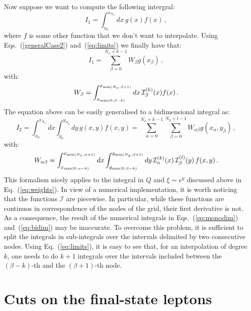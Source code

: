 \documentclass[10pt,a4paper]{article}
\begin{document}
Now suppose we want to compute the following intergral:
\begin{equation}
I_1 = \int_{x_0}^{x_{N_x}}dx\,g(x)f(x)\,,
\end{equation}
where $f$ is some other function that we don't want to
interpolate. Using Eqs.~(\ref{generalCase2}) and~(\ref{eq:limits}) we
finally have that:
\begin{equation}
  I_1 = \sum_{\beta=0}^{N_x+k-1} W_\beta g(x_{\beta})\,,
\end{equation}
with:
\begin{equation}\label{eq:monodim}
W_\beta = \int_{x_{{\rm max}(0,\beta-k)}}^{x_{{\rm min}(N_x,\beta+1)}}dx \,\mathcal{I}_\beta^{(k)}(x)f(x)\,.
\end{equation}
The equation above can be easily generalised to a bidimensional
integral as:
\begin{equation}
I_2 = \int_{x_0}^{x_{N_x}}dx \int_{y_0}^{y_{N_y}}dy\,g(x,y)f(x,y) = \sum_{\alpha=0}^{N_x+k-1} \sum_{\beta=0}^{N_y+l-1} W_{\alpha\beta} g(x_{\alpha},y_{\beta})\,,
\end{equation}
with:
\begin{equation}\label{eq:bidim}
W_{\alpha\beta} = \int_{x_{{\rm max}(0,\alpha-k)}}^{x_{{\rm
      min}(N_x,\alpha+1)}}dx \int_{y_{{\rm max}(0,\beta-k)}}^{y_{{\rm
      min}(N_y,\beta+1)}}dy \,\mathcal{I}_\alpha^{(k)}(x)\,\mathcal{I}_\beta^{(l)}(y)\,f(x,y)\,.
\end{equation}
This formalism nicely applies to the integral in $Q$ and $\xi=e^{y}$
discussed above in Eq.~(\ref{eq:weights}). In view of a numerical
implementation, it is worth noticing that the functions $\mathcal{I}$
are piecewise. In particular, while these functions are continuos in
correspondence of the nodes of the grid, their first derivative is
not. As a consequence, the result of the numerical integrals in
Eqs.~(\ref{eq:monodim}) and~(\ref{eq:bidim}) may be inaccurate. To
overcome this problem, it is sufficient to split the integrals in
sub-integrals over the intervals delimited by two consecutive
nodes. Using Eq.~(\ref{eq:limits}), it is easy to see that, for an
interpolation of degree $k$, one needs to do $k+1$ integrals over the
intervals included between the $(\beta-k)$-th and the $(\beta+1)$-th
node.

\section{Cuts on the final-state leptons}
\end{document}
